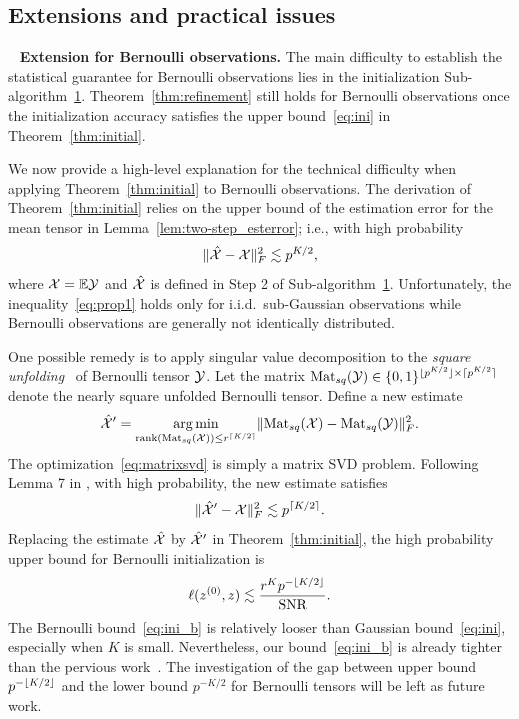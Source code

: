 \documentclass[lettersize,onecolumn,journal]{IEEEtran}
\theoremstyle{definition}
\theoremstyle{definition}
\DeclarePairedDelimiter{\ceil}{\lceil}{\rceil}
\DeclarePairedDelimiter{\floor}{\lfloor}{\rfloor}
\begin{document}
\subsection{Extensions and practical issues}~\label{subsec:exten}
\hspace{-.3cm} {\bf Extension for Bernoulli observations.} The main difficulty to establish the statistical guarantee for Bernoulli observations lies in the initialization Sub-algorithm~\hyperref[alg:main]{1}. Theorem~\ref{thm:refinement} still holds for Bernoulli observations once the initialization accuracy satisfies the upper bound~\eqref{eq:ini} in Theorem~\ref{thm:initial}.

We now provide a high-level explanation for the technical difficulty when applying Theorem~\ref{thm:initial} to Bernoulli observations. The derivation of Theorem~\ref{thm:initial} relies on the upper bound of the estimation error for the mean tensor in Lemma~\ref{lem:two-step_esterror}; i.e., with high probability
\begin{equation}\label{eq:prop1}
    \onormSize{}{\hat \tX - \tX}_F^2 \lesssim p^{K/2},
\end{equation}
where $\mathcal{X} = \mathbb{E}\mathcal{Y}$ and $\hat {\mathcal{X}}$ is defined in Step 2 of Sub-algorithm~\hyperref[alg:main]{1}. Unfortunately, the inequality~\eqref{eq:prop1} holds only for i.i.d.\ sub-Gaussian observations while Bernoulli observations are generally not identically distributed.  

One possible remedy is to apply singular value decomposition to the \emph{square unfolding}~\citep{mu2014square} of Bernoulli tensor $\mathcal{Y}$. Let the matrix $\mat_{sq} (\tY) \in \{0,1\}^{\floor{p^{K/2}} \times \ceil{p^{K/2}} }$ denote the nearly square unfolded Bernoulli tensor. Define a new estimate 
\begin{equation}\label{eq:matrixsvd}
    \hat \tX' = \argmin_{\text{rank}(\mat_{sq}(\tX)) \leq r^{\ceil{K/2}}} \onormSize{}{ \mat_{sq}(\tX) -  \mat_{sq}(\tY)}_F^2.
\end{equation}
The optimization~\eqref{eq:matrixsvd} is simply a matrix SVD problem. Following Lemma 7 in \cite{gao2018community}, with high probability, the new estimate satisfies
\begin{equation}
    \onormSize{}{\hat \tX' - \tX}_F^2 \lesssim p^{\ceil{K/2}}.
\end{equation} 
Replacing the estimate $\hat {\mathcal{X}}$ by $\hat {\mathcal{X}}'$ in Theorem~\ref{thm:initial}, the high probability upper bound for Bernoulli initialization is
\begin{equation}\label{eq:ini_b}
    \ell(z^{(0)}, z) \lesssim \frac{r^K p^{- \floor{K/2} }}{\text{SNR}}. 
\end{equation}
The Bernoulli bound~\eqref{eq:ini_b} is relatively looser than Gaussian bound~\eqref{eq:ini}, especially when $K$ is small. Nevertheless, our bound~\eqref{eq:ini_b} is already tighter than the pervious work~\citep{ke2019community}. The investigation of the gap between upper bound $p^{- \floor{K/2}}$ and the lower bound $p^{- K/2}$ for Bernoulli tensors will be left as future work. 
\end{document}
